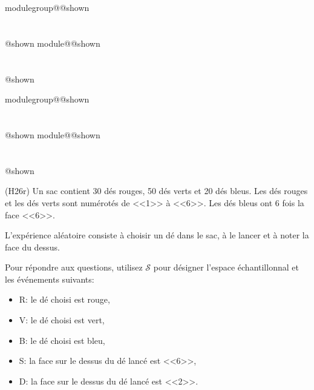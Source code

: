 \documentclass{Evaluation}
\makeatletter
\newcommand{\currentmodulekey}{}
\newcommand{\currentmoduletitle}{}
\newcommand{\currentgroupkey}{}
\newcommand{\currentgrouptitle}{}
\newcommand{\showmoduleifneeded}{%
  \ifx\currentgroupkey\empty\else
    \expandafter\ifx\csname modulegroup@\currentgroupkey @shown\endcsname\relax
      \section*{\currentgrouptitle}%
      \expandafter\gdef\csname modulegroup@\currentgroupkey @shown\endcsname{1}%
    \fi
  \fi
  \expandafter\ifx\csname module@\currentmodulekey @shown\endcsname\relax
    \section*{\currentmoduletitle}%
    \expandafter\gdef\csname module@\currentmodulekey @shown\endcsname{1}%
  \fi
}
\newenvironment{H26r}{\showmoduleifneeded}{}
\makeatother
\begin{document}
\begin{questions}
\begin{H26r}

\vspace{0.3cm}
\end{H26r}

\begin{H26r}
\question
(H26r) Un sac contient 30 dés rouges, 50 dés verts et 20 dés bleus.
Les dés rouges et les dés verts sont numérotés de <<1>> à <<6>>.
Les dés bleus ont 6 fois la face <<6>>.

L'expérience aléatoire consiste à choisir un dé dans le sac, à le lancer et à noter la face du dessus.

Pour répondre aux questions, utilisez $\mathcal{S}$ pour désigner l'espace échantillonnal et les événements suivants:

\begin{itemize}
    \item R: le dé choisi est rouge,
    \item V: le dé choisi est vert,
    \item B: le dé choisi est bleu,
    \item S: la face sur le dessus du dé lancé est <<6>>,
    \item D: la face sur le dessus du dé lancé est <<2>>.
\end{itemize}


\end{H26r}
\end{questions}
\end{document}
